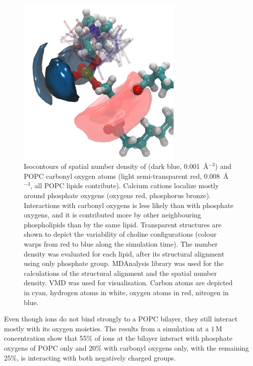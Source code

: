 \begin{figure}[tb!] 
  \centering 
  \includegraphics[width=8.0cm]{../img/ecc_popc/isocontours_r37_ca_O-carb.png} 
  \caption{\label{fig:volmaps} 
    Isocontours of spatial number density of  (dark blue, 0.001~Å$^{-3}$) 
    and POPC carbonyl oxygen atoms (light semi-transparent red, 0.008~Å$^{-3}$, all POPC lipids contribute). 
    Calcium cations localize mostly around phosphate oxygens (oxygens red, phosphorus bronze).
    Interactions with carbonyl oxygens is less likely than with phosphate oxygens, 
    and it is contributed more by other neighbouring phospholipids than by the same lipid. 
    Transparent structures are shown to depict the variability of choline configurations 
    (colour warps from red to blue along the simulation time). 
    The number density was evaluated for each lipid, 
    after its structural alignment using only phosphate group.
    MDAnalysis \citep{mdanalysis2011} library was used for 
    the calculations of the structural alignment and the spatial number density. 
    VMD \citep{hump96} was used for visualisation. 
    Carbon atoms are depicted in cyan, hydrogen atoms in white, oxygen atoms in red, nitrogen in blue.
  } 
\end{figure} 
 
Even though  ions do not bind strongly to a POPC bilayer, they still interact mostly with its oxygen moieties. The results from a simulation at a $1\,$M  concentration show that 55\% of  ions at the bilayer interact with phosphate oxygens of POPC only and 20\% with carbonyl oxygens only, with the remaining 25\%, is interacting with both negatively charged groups. 
 
